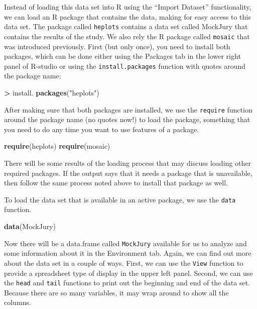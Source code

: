 \documentclass[]{book}
\newenvironment{Shaded}{\begin{snugshade}}{\end{snugshade}}
\newcommand{\KeywordTok}[1]{\textcolor[rgb]{0.13,0.29,0.53}{\textbf{#1}}}
\newcommand{\StringTok}[1]{\textcolor[rgb]{0.31,0.60,0.02}{#1}}
\newcommand{\OperatorTok}[1]{\textcolor[rgb]{0.81,0.36,0.00}{\textbf{#1}}}
\newcommand{\NormalTok}[1]{#1}
\theoremstyle{definition}
\theoremstyle{definition}
\theoremstyle{remark}
\begin{document}
Instead of loading this data set into R using the ``Import Dataset''
functionality, we can load an R package that contains the data, making
for easy access to this data set. The package called \texttt{heplots}
\citep{R-heplots} contains a data set called MockJury that contains the
results of the study. We also rely the R package called \texttt{mosaic}
\citep{R-mosaic} that was introduced previously. First (but only once),
you need to install both packages, which can be done either using the
Packages tab in the lower right panel of R-studio or using the
\texttt{install.packages} function with quotes around the package name:

\begin{Shaded}
\begin{Highlighting}[]
\OperatorTok{>}\StringTok{ }\NormalTok{install. }\KeywordTok{packages}\NormalTok{(}\StringTok{"heplots"}\NormalTok{)}
\end{Highlighting}
\end{Shaded}

After making sure that both packages are installed, we use the
\texttt{require} function around the package name (no quotes now!) to
load the package, something that you need to do any time you want to use
features of a package.

\begin{Shaded}
\begin{Highlighting}[]
\KeywordTok{require}\NormalTok{(heplots)}
\KeywordTok{require}\NormalTok{(mosaic)}
\end{Highlighting}
\end{Shaded}

There will be some results of the loading process that may discuss
loading other required packages. If the output says that it needs a
package that is unavailable, then follow the same process noted above to
install that package as well.

To load the data set that is available in an active package, we use the
\texttt{data} function.

\begin{Shaded}
\begin{Highlighting}[]
\KeywordTok{data}\NormalTok{(MockJury)}
\end{Highlighting}
\end{Shaded}

Now there will be a data.frame called \texttt{MockJury} available for us
to analyze and some information about it in the Environment tab. Again,
we can find out more about the data set in a couple of ways. First, we
can use the \texttt{View} function to provide a spreadsheet type of
display in the upper left panel. Second, we can use the \texttt{head}
and \texttt{tail} functions to print out the beginning and end of the
data set. Because there are so many variables, it may wrap around to
show all the columns.
\end{document}
